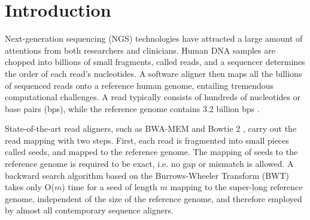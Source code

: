 \section{Introduction} 
\label{sec:introduction}

Next-generation sequencing (NGS) technologies have attracted a large amount of attentions from both researchers and clinicians. 
Human DNA samples are chopped into billions of small fragments, called reads, and a sequencer determines the order of each read's nucleotides. 
A software aligner then maps all the billions of sequenced reads onto a reference human genome, entailing tremendous computational challenges.
A read typically consists of hundreds of nucleotides or base pairs (bps), while the reference genome contains 3.2 billion bps \cite{Mardis2008}.

State-of-the-art read aligners, such as BWA-MEM \cite{BWA}\cite{BWA-SW}\cite{BWA-MEM} and Bowtie 2 \cite{Bowtie}\cite{Bowtie2}, 
carry out the read mapping with two steps. 
First, each read is fragmented into small pieces called seeds, and mapped to the reference genome. 
The mapping of seeds to the reference genome is required to be exact, i.e. no gap or mismatch is allowed. 
A backward search algorithm based on the Burrows-Wheeler Transform (BWT) \cite{BWT} takes only O($m$) time for a seed of length $m$ mapping to the super-long reference genome, independent of the size of the reference genome, and therefore employed by almost all contemporary sequence aligners.


